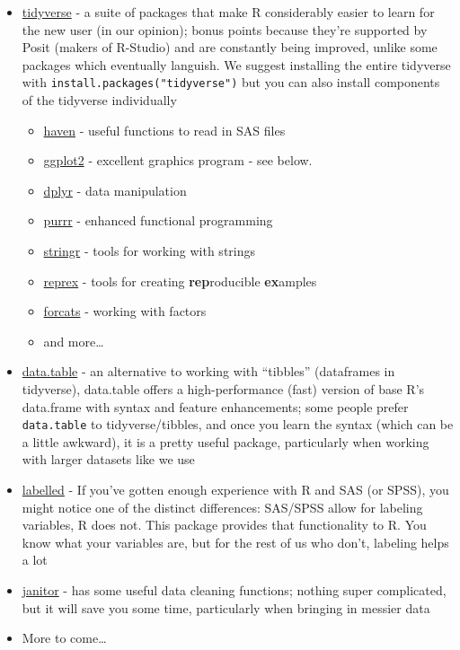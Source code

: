 \documentclass[
  letterpaper,
  DIV=11,
  numbers=noendperiod]{scrreprt}
\providecommand{\tightlist}{%
  \setlength{\itemsep}{0pt}\setlength{\parskip}{0pt}}\usepackage{longtable,booktabs,array}
\begin{document}
\begin{itemize}
\item
  \href{https://www.tidyverse.org/}{tidyverse} - a suite of packages
  that make R considerably easier to learn for the new user (in our
  opinion); bonus points because they're supported by Posit (makers of
  R-Studio) and are constantly being improved, unlike some packages
  which eventually languish. We suggest installing the entire tidyverse
  with \texttt{install.packages("tidyverse")} but you can also install
  components of the tidyverse individually

  \begin{itemize}
  \tightlist
  \item
    \href{https://haven.tidyverse.org/}{haven} - useful functions to
    read in SAS files
  \item
    \href{https://ggplot2.tidyverse.org/}{ggplot2} - excellent graphics
    program - see below.
  \item
    \href{https://dplyr.tidyverse.org/}{dplyr} - data manipulation
  \item
    \href{https://purr.tidyverse.org/}{purrr} - enhanced functional
    programming
  \item
    \href{https://stringr.tidyverse.org/}{stringr} - tools for working
    with strings
  \item
    \href{https://reprex.tidyverse.org/}{reprex} - tools for creating
    \textbf{rep}roducible \textbf{ex}amples
  \item
    \href{https://forcats.tidyverse.org/}{forcats} - working with
    factors
  \item
    and more\ldots{}
  \end{itemize}
\item
  \href{http://rdatatable.gitlab.io/data.table/}{data.table} - an
  alternative to working with ``tibbles'' (dataframes in tidyverse),
  data.table offers a high-performance (fast) version of base R's
  data.frame with syntax and feature enhancements; some people prefer
  \texttt{data.table} to tidyverse/tibbles, and once you learn the
  syntax (which can be a little awkward), it is a pretty useful package,
  particularly when working with larger datasets like we use
\item
  \href{https://larmarange.github.io/labelled/}{labelled} - If you've
  gotten enough experience with R and SAS (or SPSS), you might notice
  one of the distinct differences: SAS/SPSS allow for labeling
  variables, R does not. This package provides that functionality to R.
  You know what your variables are, but for the rest of us who don't,
  labeling helps a lot
\item
  \href{https://github.com/sfirke/janitor}{janitor} - has some useful
  data cleaning functions; nothing super complicated, but it will save
  you some time, particularly when bringing in messier data
\item
  More to come\ldots{}
\end{itemize}
\end{document}
